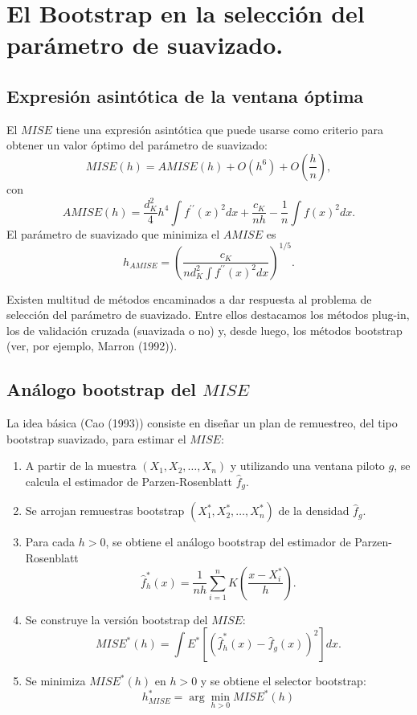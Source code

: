 \documentclass[]{book}
\theoremstyle{definition}
\theoremstyle{definition}
\theoremstyle{definition}
\theoremstyle{remark}
\begin{document}
\section{El Bootstrap en la selección del parámetro de
suavizado.}\label{el-bootstrap-en-la-seleccion-del-parametro-de-suavizado.}

\subsection{Expresión asintótica de la ventana
óptima}\label{expresion-asintotica-de-la-ventana-optima}

El \(MISE\) tiene una expresión asintótica que puede usarse como
criterio para obtener un valor óptimo del parámetro de
suavizado:\[MISE\left( h \right) =AMISE\left( h \right) +O\left( h^{6} \right) +O\left( 
\frac{h}{n} \right),\]con\[AMISE\left( h \right) =\frac{d_{K}^2}{4}h^{4}\int f^{\prime \prime }\left(
x \right)^2dx+\frac{c_{K}}{nh}-\frac{1}{n}\int f\left( x \right)^2dx.\]El
parámetro de suavizado que minimiza el \(AMISE\)
es\[h_{AMISE}=\left( \frac{c_{K}}{nd_{K}^2\int f^{\prime \prime }\left(
x \right)^2dx} \right)^{1/5}.\]

Existen multitud de métodos encaminados a dar respuesta al problema de
selección del parámetro de suavizado. Entre ellos destacamos los métodos
plug-in, los de validación cruzada (suavizada o no) y, desde luego, los
métodos bootstrap (ver, por ejemplo, Marron (1992)).

\subsection{\texorpdfstring{Análogo bootstrap del
\(MISE\)}{Análogo bootstrap del MISE}}\label{analogo-bootstrap-del-mise}

La idea básica (Cao (1993)) consiste en diseñar un plan de remuestreo,
del tipo bootstrap suavizado, para estimar el \(MISE\):

\begin{enumerate}
\def\labelenumi{\arabic{enumi}.}
\item
  A partir de la muestra \(\left( X_1,X_2,\ldots ,X_n \right)\) y
  utilizando una ventana piloto \(g\), se calcula el estimador de
  Parzen-Rosenblatt \(\hat{f}_{g}\).
\item
  Se arrojan remuestras bootstrap
  \(\left( X_1^{\ast},X_2^{\ast },\ldots ,X_n^{\ast} \right)\) de la
  densidad \(\hat{f}_{g}\).
\item
  Para cada \(h>0\), se obtiene el análogo bootstrap del estimador de
  Parzen-Rosenblatt
  \[\hat{f}_{h}^{\ast}\left( x \right) =\frac{1}{nh}\sum_{i=1}^{n}K\left( \frac{
  x-X_i^{\ast}}{h} \right).\]
\item
  Se construye la versión bootstrap del
  \(MISE\):\[MISE^{\ast}\left( h \right) =\int E^{\ast}\left[ \left( \hat{f}_{h}^{\ast
  }\left( x \right) -\hat{f}_{g}\left( x \right) \right)^2\right] dx.\]
\item
  Se minimiza \(MISE^{\ast}\left( h \right)\) en \(h>0\) y se obtiene el
  selector bootstrap:
  \[h_{MISE}^{\ast}=\arg \min_{h>0}MISE^{\ast}\left( h \right)\]
\end{enumerate}
\end{document}
